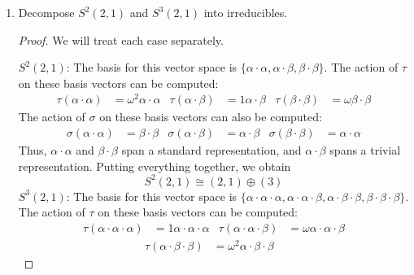 \documentclass[../psets.tex]{subfiles}
\begin{document}
\begin{enumerate}
\begin{enumerate}
\begin{proof}
\begin{align*}
                \Lambda^2V &\cong [\Lambda^2(3)]\oplus[(3)\otimes(2,1)]\oplus[\Lambda^2(2,1)]\\
                &\cong 0\oplus(2,1)\oplus(1,1,1)\\
                \Aboxed{\Lambda^2V &\cong (2,1)\oplus(1,1,1)}
            \end{align*}
        \end{proof}
        \item Decompose $S^2(2,1)$ and $S^3(2,1)$ into irreducibles.
        \begin{proof}
            We will treat each case separately.\par
            \underline{$S^2(2,1)$}: The basis for this vector space is $\{\alpha\cdot\alpha,\alpha\cdot\beta,\beta\cdot\beta\}$. The action of $\tau$ on these basis vectors can be computed:
            \begin{align*}
                \tau(\alpha\cdot\alpha) &= \omega^2\alpha\cdot\alpha&
                \tau(\alpha\cdot\beta) &= 1\alpha\cdot\beta&
                \tau(\beta\cdot\beta) &= \omega\beta\cdot\beta
            \end{align*}
            The action of $\sigma$ on these basis vectors can also be computed:
            \begin{align*}
                \sigma(\alpha\cdot\alpha) &= \beta\cdot\beta&
                \sigma(\alpha\cdot\beta) &= \alpha\cdot\beta&
                \sigma(\beta\cdot\beta) &= \alpha\cdot\alpha
            \end{align*}
            Thus, $\alpha\cdot\alpha$ and $\beta\cdot\beta$ span a standard representation, and $\alpha\cdot\beta$ spans a trivial representation. Putting everything together, we obtain
            \begin{equation*}
                \boxed{S^2(2,1) \cong (2,1)\oplus(3)}
            \end{equation*}
            \underline{$S^3(2,1)$}: The basis for this vector space is $\{\alpha\cdot\alpha\cdot\alpha,\alpha\cdot\alpha\cdot\beta,\alpha\cdot\beta\cdot\beta,\beta\cdot\beta\cdot\beta\}$. The action of $\tau$ on these basis vectors can be computed:
            \begin{align*}
                \tau(\alpha\cdot\alpha\cdot\alpha) &= 1\alpha\cdot\alpha\cdot\alpha&
                \tau(\alpha\cdot\alpha\cdot\beta) &= \omega\alpha\cdot\alpha\cdot\beta
            \end{align*}
            \begin{align*}
                \tau(\alpha\cdot\beta\cdot\beta) &= \omega^2\alpha\cdot\beta\cdot\beta&

\end{align*}
\end{proof}
\end{enumerate}
\end{enumerate}
\end{document}
